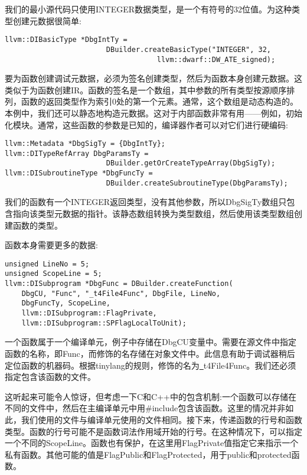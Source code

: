 我们的最小源代码只使用INTEGER数据类型，是一个有符号的32位值。为这种类型创建元数据很简单:\par

\begin{lstlisting}[caption={}]
llvm::DIBasicType *DbgIntTy =
						DBuilder.createBasicType("INTEGER", 32,
									llvm::dwarf::DW_ATE_signed);
\end{lstlisting}

要为函数创建调试元数据，必须为签名创建类型，然后为函数本身创建元数据。这类似于为函数创建IR。函数的签名是一个数组，其中参数的所有类型按源顺序排列，函数的返回类型作为索引0处的第一个元素。通常，这个数组是动态构造的。本例中，我们还可以静态地构造元数据。这对于内部函数非常有用——例如，初始化模块。通常，这些函数的参数是已知的，编译器作者可以对它们进行硬编码:\par

\begin{lstlisting}[caption={}]
llvm::Metadata *DbgSigTy = {DbgIntTy};
llvm::DITypeRefArray DbgParamsTy =
						DBuilder.getOrCreateTypeArray(DbgSigTy);
llvm::DISubroutineType *DbgFuncTy =
						DBuilder.createSubroutineType(DbgParamsTy);
\end{lstlisting}

我们的函数有一个INTEGER返回类型，没有其他参数，所以DbgSigTy数组只包含指向该类型元数据的指针。该静态数组转换为类型数组，然后使用该类型数组创建函数的类型。\par

函数本身需要更多的数据:\par

\begin{lstlisting}[caption={}]
unsigned LineNo = 5;
unsigned ScopeLine = 5;
llvm::DISubprogram *DbgFunc = DBuilder.createFunction(
	DbgCU, "Func", "_t4File4Func", DbgFile, LineNo,
	DbgFuncTy, ScopeLine, 
	llvm::DISubprogram::FlagPrivate,
	llvm::DISubprogram::SPFlagLocalToUnit);
\end{lstlisting}

一个函数属于一个编译单元，例子中存储在DbgCU变量中。需要在源文件中指定函数的名称，即Func，而修饰的名存储在对象文件中。此信息有助于调试器稍后定位函数的机器码。根据tinylang的规则，修饰的名为\underline{~}t4File4Func。我们还必须指定包含该函数的文件。\par

这听起来可能令人惊讶，但考虑一下C和C++中的包含机制:一个函数可以存储在不同的文件中，然后在主编译单元中用\#include包含该函数。这里的情况并非如此，我们使用的文件与编译单元使用的文件相同。接下来，传递函数的行号和函数类型。函数的行号可能不是函数词法作用域开始的行号。在这种情况下，可以指定一个不同的ScopeLine。函数也有保护，在这里用FlagPrivate值指定它来指示一个私有函数。其他可能的值是FlagPublic和FlagProtected，用于public和protected函数。\par

